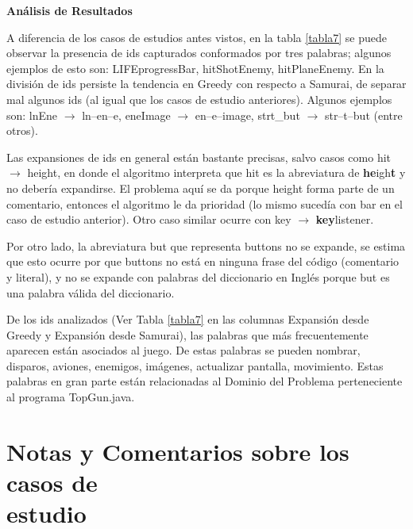 \noindent \textbf{Análisis de Resultados\\}

A diferencia de los casos de estudios antes vistos, en la tabla \ref{tabla7} se puede observar la presencia de ids capturados conformados por tres palabras; algunos ejemplos de esto son: \textsf{LIFEprogressBar}, \textsf{hitShotEnemy}, \textsf{hitPlaneEnemy}.
En la división de ids persiste la tendencia en Greedy con respecto a Samurai, de separar mal algunos ids (al igual que los casos de estudio anteriores). Algunos ejemplos son: \textsf{lnEne} $\rightarrow$ \textsf{ln--en--e}, \textsf{eneImage}  $\rightarrow$ \textsf{en--e--image}, \textsf{strt\_but} $\rightarrow$ \textsf{str--t--but} (entre otros).

Las expansiones de ids en general están bastante precisas, salvo casos como \textsf{hit} $\rightarrow$ \textsf{height}, en donde el algoritmo interpreta que \textsf{hit} es la abreviatura de \textsf{\textbf{he}igh\textbf{t}} y no debería expandirse. El problema aquí se da porque \textsf{height} forma parte de un comentario, entonces el algoritmo le da prioridad (lo mismo sucedía con \textsf{bar} en el caso de estudio anterior). Otro caso similar ocurre con \textsf{key} $\rightarrow$ \textsf{\textbf{key}listener}.

Por otro lado, la abreviatura \textsf{but} que representa \textsf{buttons} no se expande, se estima que esto ocurre por que \textsf{buttons} no está en ninguna frase del código (comentario y literal), y no se expande con palabras del diccionario en Inglés porque \textsf{but} es una palabra válida del diccionario.

De los ids analizados (Ver Tabla \ref{tabla7} en las columnas Expansión desde Greedy y Expansión desde Samurai), las palabras que más frecuentemente aparecen están asociados al juego. De estas palabras se pueden nombrar, disparos, aviones, enemigos, imágenes, actualizar pantalla, movimiento. Estas palabras en gran parte están relacionadas al Dominio del Problema perteneciente al programa TopGun.java.

\section{Notas y Comentarios sobre los casos de\\ estudio}

